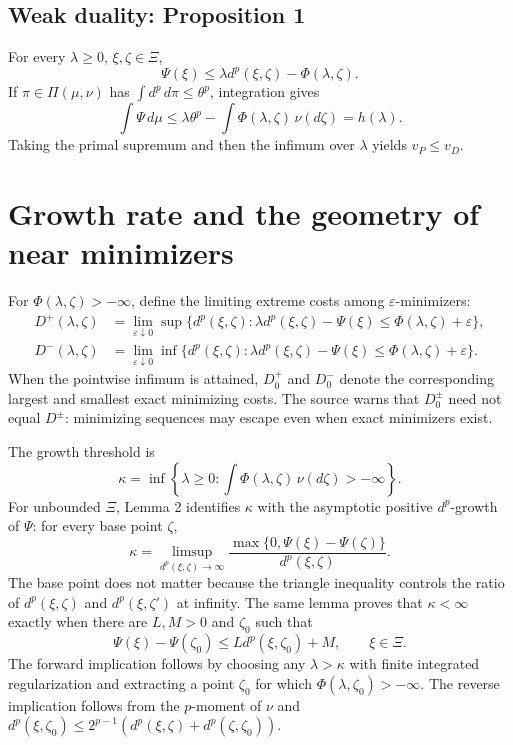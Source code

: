 \subsection{Weak duality: Proposition 1}
For every \(\lambda\ge0\), \(\xi,\zeta\in\Xi\),
\[
 \Psi(\xi)\le \lambda d^p(\xi,\zeta)-\Phi(\lambda,\zeta).
\]
If \(\pi\in\Pi(\mu,\nu)\) has \(\int d^p\,d\pi\le\theta^p\), integration gives
\[
 \int\Psi\,d\mu
 \le \lambda\theta^p-\int\Phi(\lambda,\zeta)\,\nu(d\zeta)=h(\lambda).
\]
Taking the primal supremum and then the infimum over \(\lambda\) yields
\(v_P\le v_D\).

\section{Growth rate and the geometry of near minimizers}
For \(\Phi(\lambda,\zeta)>-\infty\), define the limiting extreme costs among
\(\varepsilon\)-minimizers:
\begin{align}
 D^+(\lambda,\zeta)
 &=\lim_{\varepsilon\downarrow0}
   \sup\{d^p(\xi,\zeta):
     \lambda d^p(\xi,\zeta)-\Psi(\xi)
       \le\Phi(\lambda,\zeta)+\varepsilon\},\label{eq:gk-Dplus}\\
 D^-(\lambda,\zeta)
 &=\lim_{\varepsilon\downarrow0}
   \inf\{d^p(\xi,\zeta):
     \lambda d^p(\xi,\zeta)-\Psi(\xi)
       \le\Phi(\lambda,\zeta)+\varepsilon\}.\label{eq:gk-Dminus}
\end{align}
When the pointwise infimum is attained, \(D_0^+\) and \(D_0^-\) denote the corresponding
largest and smallest exact minimizing costs.  The source warns that \(D_0^\pm\) need not equal
\(D^\pm\): minimizing sequences may escape even when exact minimizers exist.

The growth threshold is
\begin{equation}\label{eq:gk-kappa}
 \kappa=\inf\left\{\lambda\ge0:
       \int\Phi(\lambda,\zeta)\,\nu(d\zeta)>-\infty\right\}.
\end{equation}
For unbounded \(\Xi\), Lemma 2 identifies \(\kappa\) with the asymptotic positive
\(d^p\)-growth of \(\Psi\): for every base point \(\zeta\),
\begin{equation}\label{eq:gk-growth}
 \kappa=\limsup_{d^p(\xi,\zeta)\to\infty}
 \frac{\max\{0,\Psi(\xi)-\Psi(\zeta)\}}{d^p(\xi,\zeta)}.
\end{equation}
The base point does not matter because the triangle inequality controls the ratio of
\(d^p(\xi,\zeta)\) and \(d^p(\xi,\zeta')\) at infinity.  The same lemma proves that
\(\kappa<\infty\) exactly when there are \(L,M>0\) and \(\zeta_0\) such that
\[
 \Psi(\xi)-\Psi(\zeta_0)\le Ld^p(\xi,\zeta_0)+M,
 \qquad \xi\in\Xi.
\]
The forward implication follows by choosing any \(\lambda>\kappa\) with finite integrated
regularization and extracting a point \(\zeta_0\) for which \(\Phi(\lambda,\zeta_0)>-\infty\).
The reverse implication follows from the \(p\)-moment of \(\nu\) and
\(d^p(\xi,\zeta_0)\le 2^{p-1}(d^p(\xi,\zeta)+d^p(\zeta,\zeta_0))\).

